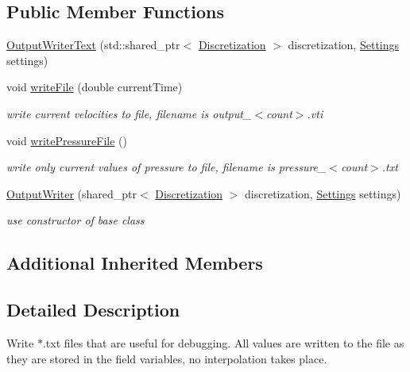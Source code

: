 \subsection*{Public Member Functions}
\begin{DoxyCompactItemize}
\item 
\mbox{\hyperlink{classOutputWriterText_a9ab79a49a916441fdeb11215515c9ca1}{Output\+Writer\+Text}} (std\+::shared\+\_\+ptr$<$ \mbox{\hyperlink{classDiscretization}{Discretization}} $>$ discretization, \mbox{\hyperlink{structSettings}{Settings}} settings)
\item 
void \mbox{\hyperlink{classOutputWriterText_a25a12ea2524fc34e9acb19ef1f4c7431}{write\+File}} (double current\+Time)
\begin{DoxyCompactList}\small\item\em write current velocities to file, filename is output\+\_\+$<$count$>$.\+vti \end{DoxyCompactList}\item 
void \mbox{\hyperlink{classOutputWriterText_a3480b58a23fd158f16d0ef9c1b67cbfd}{write\+Pressure\+File}} ()
\begin{DoxyCompactList}\small\item\em write only current values of pressure to file, filename is pressure\+\_\+$<$count$>$.\+txt \end{DoxyCompactList}\item 
\mbox{\hyperlink{classOutputWriterText_a07a48bbf23f44147dce2ea3548f1d8e0}{Output\+Writer}} (shared\+\_\+ptr$<$ \mbox{\hyperlink{classDiscretization}{Discretization}} $>$ discretization, \mbox{\hyperlink{structSettings}{Settings}} settings)
\begin{DoxyCompactList}\small\item\em use constructor of base class \end{DoxyCompactList}\end{DoxyCompactItemize}
\subsection*{Additional Inherited Members}


\subsection{Detailed Description}
Write $\ast$.txt files that are useful for debugging. All values are written to the file as they are stored in the field variables, no interpolation takes place. 

